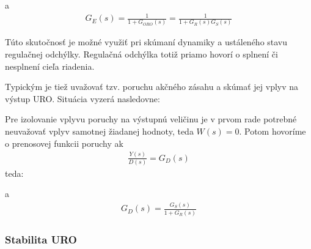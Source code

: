 \documentclass[a4paper, 10pt, ]{article}
\begin{document}
\begin{center}


	\figcaption{}
	\label{schLinURO_GE.pdf}

\end{center}

\noindent
a
\begin{align}
    G_E(s) = \frac{1}{1+G_{ORO}(s)} = \frac{1}{1 + G_R(s) G_S(s)}
\end{align}

Túto skutočnosť je možné využiť pri skúmaní dynamiky a ustáleného stavu regulačnej odchýlky. Regulačná odchýlka totiž priamo hovorí o splnení či nesplnení cieľa riadenia.

Typickým je tiež uvažovať tzv. poruchu akčného zásahu a skúmať jej vplyv na výstup URO. Situácia vyzerá nasledovne:

\begin{center}


	\label{schLinURO_basic_porucha.pdf}

\end{center}

Pre izolovanie vplyvu poruchy na výstupnú veličinu je v prvom rade potrebné neuvažovať vplyv samotnej žiadanej hodnoty, teda $W(s) = 0$. Potom hovoríme o prenosovej funkcii poruchy ak
\begin{align}
    \frac{Y(s)}{D(s)} = G_D(s)
\end{align}
teda:

\begin{center}


	\figcaption{}
	\label{schLinURO_GD.pdf}

\end{center}

\noindent
a
\begin{align}
    G_D(s) = \frac{G_S(s)}{1 + G_R(s)}
\end{align}




\subsubsection{Stabilita URO}
\end{document}
